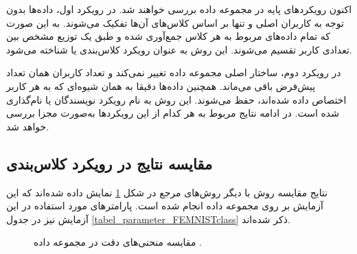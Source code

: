 اکنون رویکردهای پایه در مجموعه داده
بررسی خواهند شد. در رویکرد اول، داده‌ها بدون توجه به کاربران اصلی و تنها بر اساس کلاس‌های آن‌ها تفکیک می‌شوند. به این صورت که تمام داده‌های مربوط به هر کلاس جمع‌آوری شده و طبق یک توزیع مشخص بین تعدادی کاربر تقسیم می‌شوند. این روش به عنوان رویکرد کلاس‌بندی یا
شناخته می‌شود.

در رویکرد دوم، ساختار اصلی مجموعه داده تغییر نمی‌کند و تعداد کاربران همان تعداد پیش‌فرض باقی می‌ماند. همچنین داده‌ها دقیقا به همان شیوه‌ای که به هر کاربر اختصاص داده شده‌اند، حفظ می‌شوند. این روش به نام رویکرد نویسندگان یا
نام‌گذاری شده است. در ادامه نتایج مربوط به هر کدام از این رویکرد‌ها به‌صورت مجزا بررسی خواهد شد.


\subsection{
	مقایسه نتایج در رویکرد کلاس‌بندی
}

نتایج مقایسه روش
با دیگر روش‌های مرجع در شکل
\ref{result_FEMNISTclass}
نمایش داده شده‌اند که این آزمایش بر روی مجموعه داده
انجام شده است. پارامترهای مورد استفاده در این آزمایش نیز در جدول
\ref{tabel_parameter_FEMNISTclass}
ذکر شده‌اند.


\begin{figure}[b!]
	\centering
	\hspace{0.8mm}
	\caption{
		مقایسه منحنی‌های دقت در مجموعه داده
		.
	}
	\label{result_FEMNISTclass}
\end{figure}


